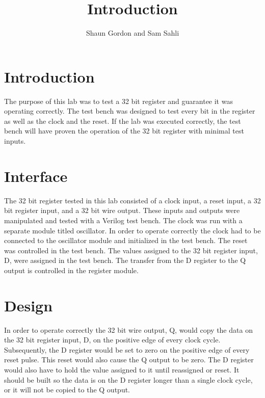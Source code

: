 \documentclass{article}
\author{Shaun Gordon and Sam Sahli}
\title{Introduction}
\begin{document}
\maketitle

\section{Introduction}
The purpose of this lab was to test a 32 bit register and guarantee it was operating correctly. The test bench was designed to test every bit in the register as well as the clock and the reset. If the lab was executed correctly, the test bench will have proven the operation of the 32 bit register with minimal test inputs.

\section{Interface}
The 32 bit register tested in this lab consisted of a clock input, a reset input, a 32 bit register input, and a 32 bit wire output. These inputs and outputs were manipulated and tested with a Verilog test bench. The clock was run with a separate module titled oscillator. In order to operate correctly the clock had to be connected to the oscillator module and initialized in the test bench. The reset was controlled in the test bench. The values assigned to the 32 bit register input, D, were assigned in the test bench. The transfer from the D register to the Q output is controlled in the register module. 

\section{Design}
In order to operate correctly the 32 bit wire output, Q, would copy the data on the 32 bit register input, D, on the positive edge of every clock cycle. Subsequently, the D register would be set to zero on the positive edge of every reset pulse. This reset would also cause the Q output to be zero. The D register would also have to hold the value assigned to it until reassigned or reset. It should be built so the data is on the D register longer than a single clock cycle, or it will not be copied to the Q output. 
\end{document}
